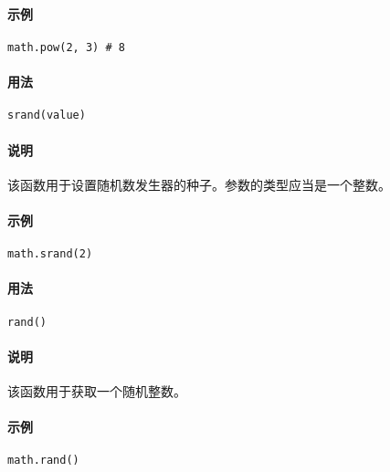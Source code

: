\paragraph{示例}
\begin{lstlisting}[language=berry, numbers=none]
math.pow(2, 3) # 8
\end{lstlisting}


\paragraph{用法}
\begin{lstlisting}[language=berry, numbers=none]
srand(value)
\end{lstlisting}

\paragraph{说明}
该函数用于设置随机数发生器的种子。参数的类型应当是一个整数。

\paragraph{示例}
\begin{lstlisting}[language=berry, numbers=none]
math.srand(2)
\end{lstlisting}


\paragraph{用法}
\begin{lstlisting}[language=berry, numbers=none]
rand()
\end{lstlisting}

\paragraph{说明}
该函数用于获取一个随机整数。

\paragraph{示例}
\begin{lstlisting}[language=berry, numbers=none]
math.rand()
\end{lstlisting}

